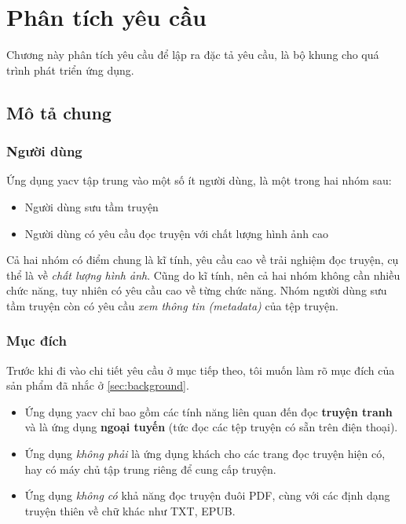 \documentclass[../../thesis]{subfiles}
\begin{document}
\chapter{Phân tích yêu cầu}\label{chap:requirements}

Chương này phân tích yêu cầu để lập ra đặc tả yêu cầu, là bộ khung cho quá trình
phát triển ứng dụng.



\section{Mô tả chung}\label{sec:overview}

\subsection{Người dùng}\label{sec:users}

Ứng dụng yacv tập trung vào một số ít người dùng, là một trong hai nhóm sau:

\begin{itemize}
    \item
        Người dùng sưu tầm truyện
    \item
        Người dùng có yêu cầu đọc truyện với chất lượng hình ảnh cao
\end{itemize}

Cả hai nhóm có điểm chung là kĩ tính, yêu cầu cao về trải nghiệm đọc truyện, cụ
thể là về \emph{chất lượng hình ảnh}. Cũng do kĩ tính, nên cả hai nhóm không cần
nhiều chức năng, tuy nhiên có yêu cầu cao về từng chức năng. Nhóm người dùng sưu
tầm truyện còn có yêu cầu \emph{xem thông tin (metadata)} của tệp truyện.

\subsection{Mục đích}\label{sec:objectives}

Trước khi đi vào chi tiết yêu cầu ở mục tiếp theo, tôi muốn làm rõ mục đích của
sản phẩm đã nhắc ở \autoref{sec:background}.

\begin{itemize}
    \item
        Ứng dụng yacv chỉ bao gồm các tính năng liên quan đến đọc \textbf{truyện
        tranh} và là ứng dụng \textbf{ngoại tuyến} (tức đọc các tệp truyện có
        sẵn trên điện thoại).
    \item
        Ứng dụng \emph{không phải} là ứng dụng khách cho các trang đọc truyện
        hiện có, hay có máy chủ tập trung riêng để cung cấp truyện.
    \item
        Ứng dụng \emph{không có} khả năng đọc truyện đuôi PDF, cùng với các định
        dạng truyện thiên về chữ khác như TXT, EPUB.
\end{itemize}
\end{document}
